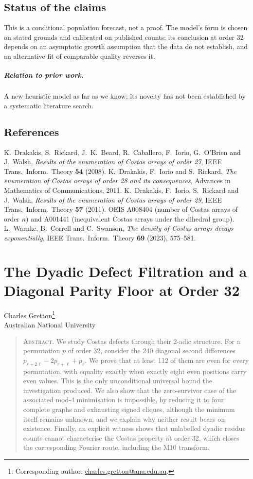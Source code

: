 \documentclass[11pt,a4paper,oneside]{report}
\makeatletter
\theoremstyle{definition}
\newcommand{\paperauthor}{\begin{center}\large Charles Gretton\footnote{Corresponding author: \href{mailto:charles.gretton@anu.edu.au}{charles.gretton@anu.edu.au}.}\\[2pt]\normalsize Australian National University\end{center}\vspace{0.5em}}
\newcommand{\paperabstract}[1]{\begin{quote}\small\noindent\textsc{Abstract.} #1\end{quote}\vspace{0.5em}}
\newenvironment{paperrefs}{\section*{References}\list{\@biblabel{\@arabic\c@enumiv}}{\settowidth\labelwidth{\@biblabel{99}}\leftmargin\labelwidth\advance\leftmargin\labelsep\usecounter{enumiv}\let\p@enumiv\@empty\renewcommand\theenumiv{\@arabic\c@enumiv}}\sloppy\small}{\endlist}
\makeatother
\begin{document}
\section{Status of the claims}\label{p6-sec:status}
This is a conditional population forecast, not a proof. The model's form is chosen on stated
grounds and calibrated on published counts; its conclusion at order 32 depends on an asymptotic
growth assumption that the data do not establish, and an alternative fit of comparable quality
reverses it.

\paragraph{Relation to prior work.} A new heuristic model as far as we know; its novelty has not been established by a systematic literature search.
\begin{paperrefs}
 K.~Drakakis, S.~Rickard, J.~K.~Beard, R.~Caballero,
F.~Iorio, G.~O'Brien and J.~Walsh, \emph{Results of the enumeration of Costas
arrays of order 27}, IEEE Trans.\ Inform.\ Theory \textbf{54} (2008).
 K.~Drakakis, F.~Iorio and S.~Rickard, \emph{The enumeration of Costas arrays of order 28 and its consequences}, Advances in Mathematics of Communications, 2011.
 K.~Drakakis, F.~Iorio, S.~Rickard and J.~Walsh,
\emph{Results of the enumeration of Costas arrays of order 29}, IEEE Trans.\
Inform.\ Theory \textbf{57} (2011).
 OEIS A008404 (number of Costas arrays of order $n$) and A001441
(inequivalent Costas arrays under the dihedral group).
 L.~Warnke, B.~Correll and C.~Swanson, \emph{The density of
Costas arrays decays exponentially}, IEEE Trans.\ Inform.\ Theory \textbf{69}
(2023), 575--581.
\end{paperrefs}

\clearpage
\chapter{The Dyadic Defect Filtration and a Diagonal Parity Floor at Order 32}\label{p7-paper}
\paperauthor
\paperabstract{We study Costas defects through their 2-adic structure. For a permutation $p$ of order 32,
consider the 240 diagonal second differences $p_{r+2\ell}-2p_{r+\ell}+p_r$. We prove that at least
112 of them are even for every permutation, with equality exactly when exactly eight even positions
carry even values. This is the only unconditional universal bound the investigation produced. We also show that the zero-survivor case of the associated mod-4 minimisation is impossible, by reducing it to four complete graphs and exhausting signed cliques, although the minimum itself remains unknown, and we explain why neither result bears on existence. Finally, an explicit witness shows that unlabelled dyadic residue counts cannot characterise the Costas property at order 32, which closes the corresponding Fourier route, including the M10 transform.}
\end{document}
